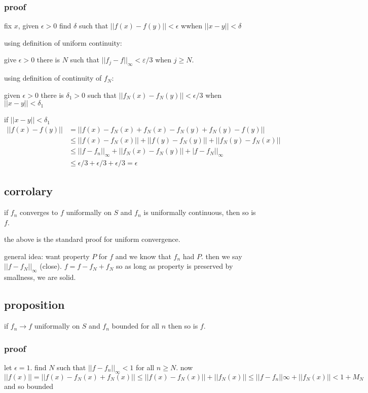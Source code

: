 \documentclass[letterpaper]{article}
\begin{document}
\subsubsection*{proof}
fix $x$, given $\epsilon>0$ find $\delta$ such that $||f(x)-f(y)||<\epsilon$ wwhen $||x-y||<\delta$

using definition of uniform continuity:

give $\epsilon>0$ there is $N$ such that $||f_j-f||_\infty<\varepsilon/3$ when $j\ge N$. 

using definition of continuity of $f_N$:

given $\epsilon>0$ there is $\delta_1>0$ such that $||f_N(x)-f_N(y)||<\epsilon/3$ when $||x-y||<\delta_1$

if $||x-y||<\delta_1$
\begin{align*}
  ||f(x)-f(y)||&=||f(x)-f_N(x)+f_N(x)-f_N(y)+f_N(y)-f(y)||\\
  &\le ||f(x)-f_N(x)||+||f(y)-f_N(y)||+||f_N(y)-f_N(x)||\\
  &\le ||f-f_n||_\infty+||f_N(x)-f_N(y)||+|f-f_N||_\infty\\
  &\le \epsilon/3+\epsilon/3+\epsilon/3=\epsilon
\end{align*}

\subsection*{corrolary}
if $f_n$ converges to $f$ uniformally on $S$ and $f_n$ is uniformally continuous, then so is $f$.

the above is the standard proof for uniform convergence.

general idea: want property $P$ for $f$ and we know that $f_n$ had $P$. then we say $||f-f_N||_{\infty}$ (close). $f=f-f_{N}+f_N$ so as long as property is preserved by smallness, we are solid.

\subsection*{proposition}
if $f_n\to f$ uniformally on $S$ and $f_n$ bounded for all $n$ then so is $f$. 
\subsubsection*{proof}
let $\epsilon=1$. find $N$ such that $||f-f_n||_\infty<1$ for all $n\ge N$. now $||f(x)||=||f(x)-f_N(x)+f_N(x)||\le ||f(x)-f_N(x)||+||f_N(x)||\le ||f-f_n||\infty+||f_N(x)||<1+M_N$ and so bounded
\end{document}
